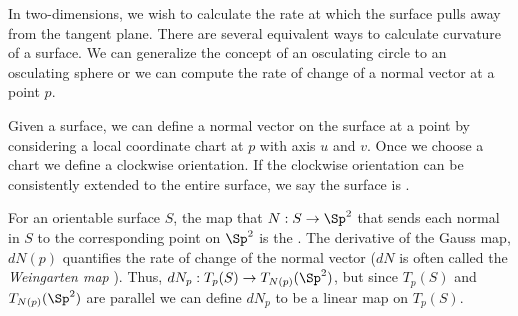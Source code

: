 In two-dimensions, we wish to calculate the rate at which the surface
pulls away from the tangent plane.  There are several equivalent ways 
to calculate curvature of a surface.
We can generalize the concept of an osculating circle to an
osculating sphere or we can compute the rate of change of
a normal vector at a point $p$.

Given a surface, we can define a normal vector on the surface at  a point
by considering a local coordinate chart at $p$ with axis $u$ and $v$.
Once we choose a chart we define a clockwise orientation. If the clockwise
orientation can be consistently extended to the entire surface, we say
the surface is .

For an orientable surface $S$, the map that  $N:S\to \Sp^2$ that sends each
normal in $S$ to the corresponding point on $\Sp^2$ is
the .
The derivative of the Gauss map, $dN(p)$ quantifies the rate of change of
the normal vector ($dN$ is often called the \emph{Weingarten map} \cite{Crane:2013}).
Thus, $dN_p:T_p(S)\to T_{N(p)}(\Sp^2)$, but since $T_p(S)$ and $T_{N(p)}(\Sp^2)$
are parallel we can define $dN_p$ to be a linear map on $T_p(S)$.









